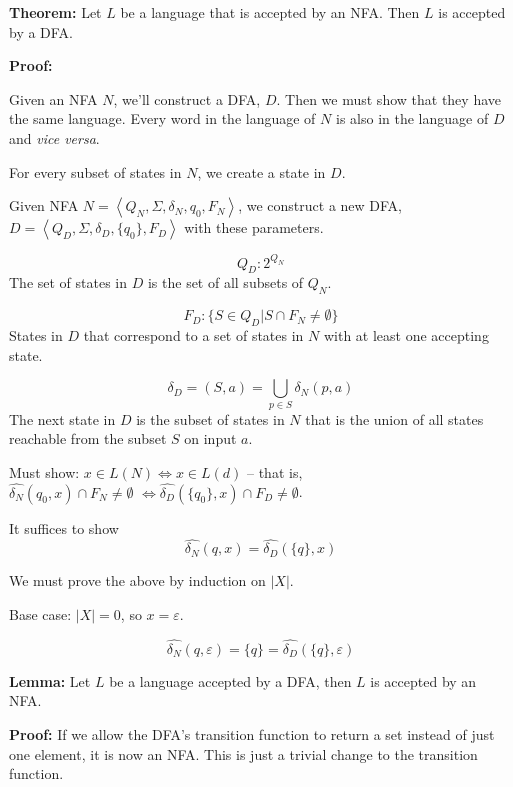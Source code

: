 \documentclass[12pt]{article}
\begin{document}
\textbf{Theorem:} Let $L$ be a language that is accepted by an NFA. Then $L$ is
accepted by a DFA.

\textbf{Proof:}

Given an NFA $N$, we'll construct a DFA, $D$. Then we must show that they have
the same language. Every word in the language of $N$ is also in the language of
$D$ and \textit{vice versa}.

For every subset of states in $N$, we create a state in $D$.

Given NFA $N = \left<Q_N, \Sigma, \delta_N, q_0, F_N\right>$, we construct a new
DFA, $D = \left<Q_D, \Sigma, \delta_D, \{q_0\}, F_D\right>$ with these
parameters.

\[Q_D: 2^{Q_N}\] The set of states in $D$ is the set of all subsets of $Q_N$.

\[F_D: \{S \in Q_D | S \cap F_N \neq \emptyset\}\]
States in $D$ that correspond to a set of states in $N$ with at least one
accepting state.

\[\delta_D = (S,a) = \bigcup_{p \in S} \delta_N(p,a)\]
The next state in $D$ is the subset of states in $N$ that is the union of all
states reachable from the subset $S$ on input $a$.

Must show: $x \in L(N) \iff x \in L(d)$ -- that is,\\
$\hat{\delta_N}(q_0,x)\cap F_N \neq \emptyset$ $\iff \hat{\delta_D}(\{q_0\},x) \cap
F_D \neq \emptyset$.

It suffices to show
\[
\hat{\delta_N}\left(q,x\right) = \hat{\delta_D}\left(\{q\},x\right)
\]

We must prove the above by induction on $|X|$.

Base case: $|X| = 0$, so $x = \varepsilon$.

\[\hat{\delta_N}(q,\varepsilon) = \{q\} = \hat{\delta_D}(\{q\},\varepsilon)\]

\textbf{Lemma:} Let $L$ be a language accepted by a DFA, then $L$ is accepted by
an NFA.

\textbf{Proof:} If we allow the DFA's transition function to return a set
instead of just one element, it is now an NFA. This is just a trivial change to
the transition function.
\end{document}
